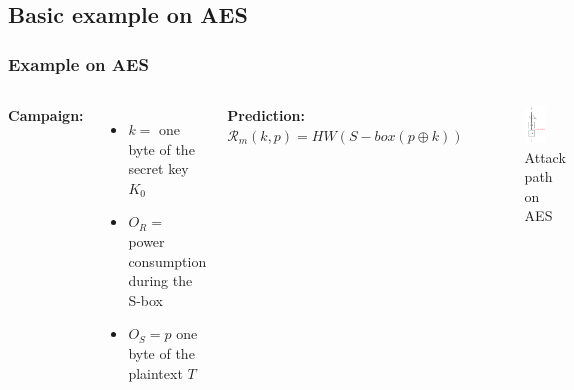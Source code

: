 \documentclass{beamer}
\begin{document}
	\subsection{Basic example on AES}
	\begin{frame}
		\frametitle{Example on AES}
		
		\begin{columns}[T]
			\textbf{Campaign:}\\
			\begin{itemize}
				\item $k = $ one byte of the secret key $K_0$
				\item $O_R = $ power consumption during the S-box
				\item $O_S = p$ one byte of the plaintext $T$
			\end{itemize}
			
			\textbf{Prediction:}\\
			$\mathcal{R}_m(k,p) = HW(S-box(p \oplus k))$
			\begin{figure}
				\includegraphics[width=0.5\textwidth]{attack_path_aes}
				\caption{Attack path on AES}
			\end{figure}
			

\end{columns}
\end{frame}
\end{document}
